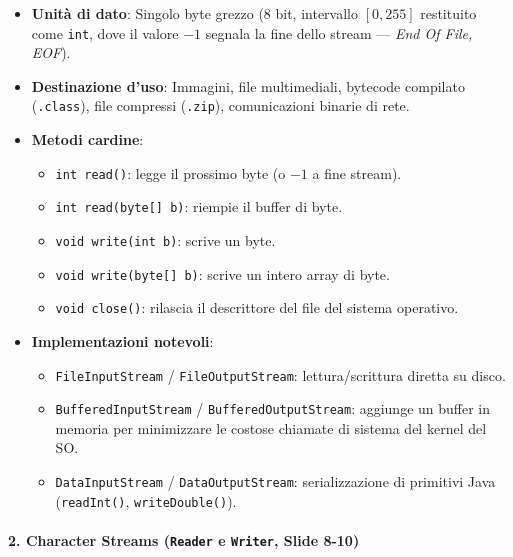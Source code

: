 \documentclass[11pt,a4paper]{article}
\newcommand{\passthrough}[1]{#1}
\providecommand{\tightlist}{\setlength{\itemsep}{0pt}\setlength{\parskip}{0pt}}
\begin{document}
\begin{itemize}
\tightlist
\item
  \textbf{Unità di dato}: Singolo byte grezzo (8 bit, intervallo
  \([0, 255]\) restituito come \passthrough{\lstinline!int!}, dove il
  valore \(-1\) segnala la fine dello stream --- \emph{End Of File,
  EOF}).
\item
  \textbf{Destinazione d'uso}: Immagini, file multimediali, bytecode
  compilato (\passthrough{\lstinline!.class!}), file compressi
  (\passthrough{\lstinline!.zip!}), comunicazioni binarie di rete.
\item
  \textbf{Metodi cardine}:

  \begin{itemize}
  \tightlist
  \item
    \passthrough{\lstinline!int read()!}: legge il prossimo byte (o
    \(-1\) a fine stream).
  \item
    \passthrough{\lstinline!int read(byte[] b)!}: riempie il buffer di
    byte.
  \item
    \passthrough{\lstinline!void write(int b)!}: scrive un byte.
  \item
    \passthrough{\lstinline!void write(byte[] b)!}: scrive un intero
    array di byte.
  \item
    \passthrough{\lstinline!void close()!}: rilascia il descrittore del
    file del sistema operativo.
  \end{itemize}
\item
  \textbf{Implementazioni notevoli}:

  \begin{itemize}
  \tightlist
  \item
    \passthrough{\lstinline!FileInputStream!} /
    \passthrough{\lstinline!FileOutputStream!}: lettura/scrittura
    diretta su disco.
  \item
    \passthrough{\lstinline!BufferedInputStream!} /
    \passthrough{\lstinline!BufferedOutputStream!}: aggiunge un buffer
    in memoria per minimizzare le costose chiamate di sistema del kernel
    del SO.
  \item
    \passthrough{\lstinline!DataInputStream!} /
    \passthrough{\lstinline!DataOutputStream!}: serializzazione di
    primitivi Java (\passthrough{\lstinline!readInt()!},
    \passthrough{\lstinline!writeDouble()!}).
  \end{itemize}
\end{itemize}

\paragraph{\texorpdfstring{2. Character Streams (\texttt{Reader} e
\texttt{Writer}, Slide
8-10)}{2. Character Streams (Reader e Writer, Slide 8-10)}}\label{character-streams-reader-e-writer-slide-8-10}
\end{document}
